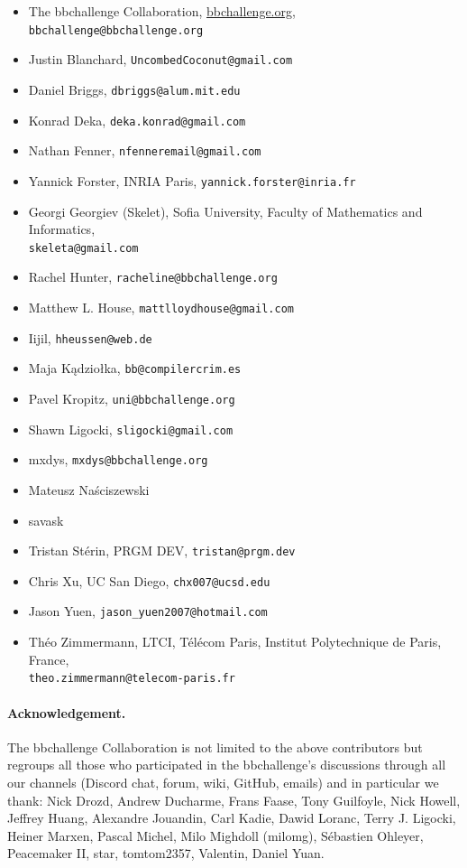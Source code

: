 \documentclass[a4paper,british]{article}
\theoremstyle{definition} %
\numberwithin{equation}{section}
\theoremstyle{definition} %
\begin{document}
\begin{itemize}
    \item The bbchallenge Collaboration, \url{bbchallenge.org}, \texttt{bbchallenge@bbchallenge.org}
    \item Justin Blanchard, \texttt{UncombedCoconut@gmail.com}
    \item Daniel Briggs, \texttt{dbriggs@alum.mit.edu}
    \item Konrad Deka, \texttt{deka.konrad@gmail.com}
    \item Nathan Fenner, \texttt{nfenneremail@gmail.com}
    \item Yannick Forster, INRIA Paris, \texttt{yannick.forster@inria.fr}
    \item Georgi Georgiev (Skelet), Sofia University, Faculty of Mathematics and Informatics,\\\texttt{skeleta@gmail.com}
    \item Rachel Hunter, \texttt{racheline@bbchallenge.org}
    \item Matthew L. House, \texttt{mattlloydhouse@gmail.com}
    \item Iijil, \texttt{hheussen@web.de}
    \item Maja Kądziołka, \texttt{bb@compilercrim.es}
    \item Pavel Kropitz, \texttt{uni@bbchallenge.org}
    \item Shawn Ligocki, \texttt{sligocki@gmail.com}
    \item mxdys, \texttt{mxdys@bbchallenge.org}
    \item Mateusz Na\'{s}ciszewski
    \item savask
    \item Tristan Stérin, PRGM DEV, \texttt{tristan@prgm.dev}
    \item Chris Xu, UC San Diego, \texttt{chx007@ucsd.edu}
    \item Jason Yuen, \texttt{jason\_yuen2007@hotmail.com}
    \item Théo Zimmermann, LTCI, Télécom Paris, Institut Polytechnique de Paris, France, \\ \texttt{theo.zimmermann@telecom-paris.fr}
\end{itemize}

\paragraph{Acknowledgement.} The bbchallenge Collaboration is not limited to the above contributors but regroups all those who participated in the bbchallenge's discussions through all our channels (Discord chat, forum, wiki, GitHub, emails) and in particular we thank:  Nick Drozd, Andrew Ducharme, Frans Faase, Tony Guilfoyle, Nick Howell, Jeffrey Huang, Alexandre Jouandin, Carl Kadie, Dawid Loranc, Terry J. Ligocki, Heiner Marxen, Pascal Michel, Milo Mighdoll (milomg), Sébastien Ohleyer, Peacemaker II, star, tomtom2357, Valentin, Daniel Yuan.
\end{document}
